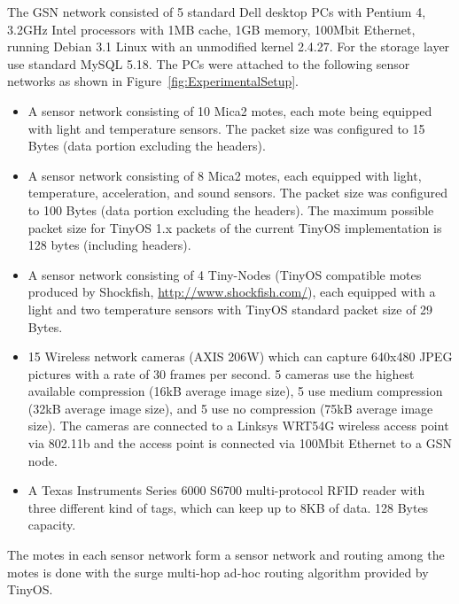 The GSN network consisted of 5 standard Dell desktop PCs with Pentium 4, 3.2GHz
Intel processors with 1MB cache, 1GB memory, 100Mbit Ethernet, running Debian
3.1 Linux with an unmodified kernel 2.4.27. For the storage layer use standard
MySQL 5.18.  The PCs were attached to the following sensor networks as shown in
Figure~\ref{fig:ExperimentalSetup}.

\begin{itemize}
  
\item A sensor network consisting of 10 Mica2 motes, each mote being equipped
  with light and temperature sensors. The packet size was configured to 15
  Bytes (data portion excluding the headers).
  
\item A sensor network consisting of 8 Mica2 motes, each equipped with light,
  temperature, acceleration, and sound sensors. The packet size was
  configured to 100 Bytes (data portion excluding the headers).  The maximum
  possible packet size for TinyOS 1.x packets of the current TinyOS
  implementation is 128 bytes (including headers).
  
\item A sensor network consisting of 4 Tiny-Nodes (TinyOS compatible motes
  produced by Shockfish, \url{http://www.shockfish.com/}), each equipped with a
  light and two temperature sensors with TinyOS standard packet size of 29
  Bytes.
  
\item 15 Wireless network cameras (AXIS 206W) which can capture 640x480 JPEG
  pictures with a rate of 30 frames per second. 5 cameras use the highest
  available compression (16kB average image size), 5 use medium compression
  (32kB average image size), and 5 use no compression (75kB average image
  size). The cameras are connected to a Linksys WRT54G wireless access point
  via 802.11b and the access point is connected via 100Mbit Ethernet to a GSN
  node.
  
\item A Texas Instruments Series 6000 S6700 multi-protocol RFID reader with
  three different kind of tags, which can keep up to 8KB of data.
  128 Bytes capacity.
  
\end{itemize}

The motes in each sensor network form a sensor network and routing among the
motes is done with the surge multi-hop ad-hoc routing algorithm provided by
TinyOS.

